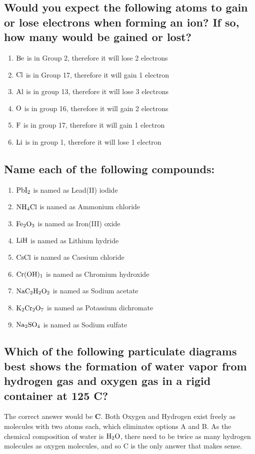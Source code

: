 \documentclass[11pt]{article}
\begin{document}
\subsection{Would you expect the following atoms to gain or lose electrons when forming an ion? If so, how many would be gained or lost?}
\label{sec:org4246ea0}
\begin{enumerate}
\item \(\ce{Be}\) is in Group 2, therefore it will lose 2 electrons
\item \(\ce{Cl}\) is in Group 17, therefore it will gain 1 electron
\item \(\ce{Al}\) is in group 13, therefore it will lose 3 electrons
\item \(\ce{O}\) is in group 16, therefore it will gain 2 electrons
\item \(\ce{F}\) is in group 17, therefore it will gain 1 electron
\item \(\ce{Li}\) is in group 1, therefore it will lose 1 electron
\end{enumerate}

\subsection{Name each of the following compounds:}
\label{sec:org1aa5924}
\begin{enumerate}
\item \(\ce{PbI2}\) is named as Lead(II) iodide
\item \(\ce{NH4Cl}\) is named as Ammonium chloride
\item \(\ce{Fe2O3}\) is named as Iron(III) oxide
\item \(\ce{LiH}\) is named as Lithium hydride
\item \(\ce{CsCl}\) is named as Caesium chloride
\item \(\ce{Cr(OH)1}\) is named as Chromium hydroxide
\item \(\ce{NaC2H2O2}\) is named as Sodium acetate
\item \(\ce{K2Cr2O7}\) is named as Potassium dichromate
\item \(\ce{Na2SO4}\) is named as Sodium sulfate
\end{enumerate}

\subsection{Which of the following particulate diagrams best shows the formation of water vapor from hydrogen gas and oxygen gas in a rigid container at 125\textdegree{} C?}
\label{sec:org4a12eb7}
The correct answer would be \textbf{C}. Both Oxygen and Hydrogen exist freely as molecules with two atoms each, which eliminates options A and B. As the chemical composition of water is \(\ce{H2O}\), there need to be twice as many hydrogen molecules as oxygen molecules, and so C is the only answer that makes sense.
\end{document}
